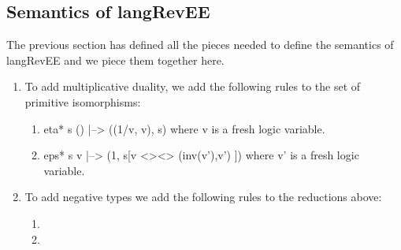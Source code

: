 \documentclass[preprint]{sigplanconf}
\begin{document}

\subsection{Semantics of {{langRevEE}} }

The previous section has defined all the pieces needed to define the
semantics of {{langRevEE}} and we piece them together here. 

\begin{enumerate}
\item 
To add multiplicative duality, we add the following rules to the set
of primitive isomorphisms:

\begin{enumerate}
\item {{eta* s () |--> ((1/v, v), s)}}
  where {{v}} is a fresh logic variable. 

\item {{eps* s v |--> (1, s[v <><> (inv(v'),v') ])}}
  where {{v'}} is a fresh logic variable. 

\end{enumerate}

\item To add negative types we add the following rules to the
  reductions above: 

  \begin{enumerate}
  \item 


    \item

  \end{enumerate}


\end{enumerate}
\end{document}
